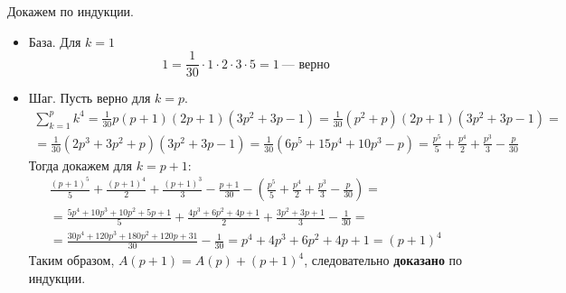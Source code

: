 \documentclass[12pt]{article}
\begin{document}
\begin{enumerate}[label={\textbf{\arabic{section}.\arabic*}}]
		Докажем по индукции.
		\begin{itemize}
			\item База. Для $k = 1$
			$$
			1 = \frac{1}{30}\cdot 1\cdot 2\cdot 3\cdot 5 = 1~\text{--- верно}
			$$ 
			\item Шаг. Пусть верно для $k = p$.
			\begin{multline*}
				\sum_{k=1}^p k^4 = \frac{1}{30} p(p+1)(2p+1)(3p^2+3p-1) = \frac{1}{30}(p^2 + p)(2p + 1)(3p^2 + 3p - 1) = \\
				= \frac{1}{30}(2p^3 + 3p^2 + p)(3p^2 + 3p - 1) = \frac{1}{30}(6p^5 + 15p^4 + 10p^3 - p) = \frac{p^5}{5} + \frac{p^4}{2} + \frac{p^3}{3} -\frac{p}{30}
			\end{multline*}
			Тогда докажем для $k = p+1$:
			\begin{multline*}
				\frac{(p+1)^5}{5} + \frac{(p+1)^4}{2} + \frac{(p+1)^3}{3} -\frac{p+1}{30} - \left(\frac{p^5}{5} + \frac{p^4}{2} + \frac{p^3}{3} -\frac{p}{30}\right) = \\
				= \frac{5p^4 + 10p^3 + 10p^2 + 5p + 1}{5} + \frac{4p^3 + 6p^2 + 4p + 1}{2} + \frac{3p^2 + 3p + 1}{3} - \frac{1}{30} = \\
				= \frac{30p^4 + 120p^3 + 180p^2 + 120p + 31}{30} - \frac{1}{30} = p^4 + 4p^3 + 6p^2 + 4p + 1 = (p+1)^4
			\end{multline*}
			Таким образом, $A(p+1) = A(p) + (p+1)^4$, следовательно \textbf{доказано} по индукции.			
		\end{itemize}
	\end{enumerate}
	\newpage
\end{document}
